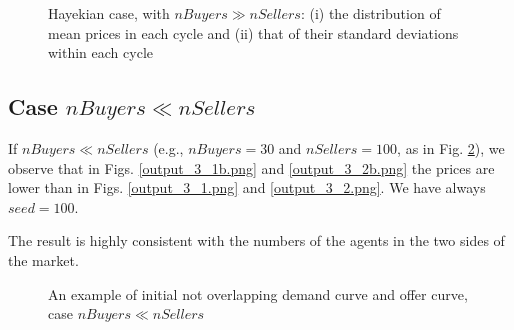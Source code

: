 \documentclass[12pt]{report}
\begin{document}
\begin{appendices}
\begin{figure}[htbp]
\begin{center}
\caption{Hayekian case, with $nBuyers \gg nSellers$: (i) the distribution of mean prices in each cycle and (ii) that of their standard deviations within each cycle}
\label{output_3_2a.png}
\end{center}
\end{figure}

\subsection{Case $nBuyers \ll nSellers$}
If $nBuyers \ll nSellers$ (e.g., $nBuyers=30$ and $nSellers=100$, as in Fig. \ref{output_2_0b.png}), we observe that in Figs. \ref{output_3_1b.png} and \ref{output_3_2b.png} the prices are lower than in Figs. \ref{output_3_1.png} and \ref{output_3_2.png}. We have always $seed=100$.

The result is highly consistent with the numbers of the agents in the two sides of the market.


\begin{figure}[htbp]
\begin{center}
\caption{An example of initial not overlapping demand curve and offer curve, case $nBuyers \ll nSellers$}
\label{output_2_0b.png}
\end{center}
\end{figure}


\end{appendices}
\end{document}
